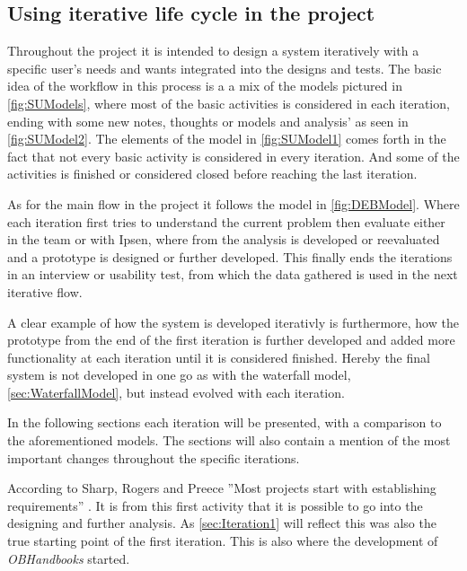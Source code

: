 
\subsection{Using iterative life cycle in the project}
Throughout the project it is intended to design a system iteratively with a specific user’s needs and wants integrated into the designs and tests. 
The basic idea of the workflow in this process is a a mix of the models pictured in \cref{fig:SUModels}, where most of the basic activities is considered in each iteration, ending with some new notes, thoughts or models and analysis' as seen in \cref{fig:SUModel2}.
The elements of the model in \cref{fig:SUModel1} comes forth in the fact that not every basic activity is considered in every iteration. And some of the activities is finished or considered closed before reaching the last iteration.

As for the main flow in the project it follows the model in \cref{fig:DEBModel}. Where each iteration first tries to understand the current problem then evaluate either in the team or with Ipsen, where from the analysis is developed or reevaluated and a prototype is designed or further developed.
This finally ends the iterations in an interview or usability test, from which the data gathered is used in the next iterative flow.

A clear example of how the system is developed iterativly is furthermore, how the prototype from the end of the first iteration is further developed and added more functionality at each iteration until it is considered finished.
Hereby the final system is not developed in one go as with the waterfall model, \cref{sec:WaterfallModel},  but instead evolved with each iteration.

In the following sections each iteration will be presented, with a comparison to the aforementioned models.
The sections will also contain a mention of the most important changes throughout the specific iterations. 

According to Sharp, Rogers and Preece ''Most projects start with establishing requirements'' \citep[p.~333]{InteractionDesign}. 
It is from this first activity that it is possible to go into the designing and further analysis.
As \cref{sec:Iteration1} will reflect this was also the true starting point of the first iteration.
This is also where the development of \textit{OBHandbooks} started.
